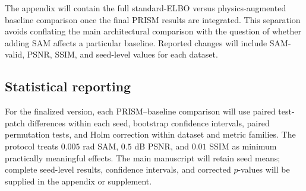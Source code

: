 \documentclass{article}
\begin{document}
The appendix will contain the full standard-ELBO versus physics-augmented baseline comparison once the final PRISM results are integrated. This separation avoids conflating the main architectural comparison with the question of whether adding SAM affects a particular baseline. Reported changes will include SAM-valid, PSNR, SSIM, and seed-level values for each dataset.

\subsection{Statistical reporting}

For the finalized version, each PRISM--baseline comparison will use paired test-patch differences within each seed, bootstrap confidence intervals, paired permutation tests, and Holm correction within dataset and metric families. The protocol treats $0.005$ rad SAM, $0.5$ dB PSNR, and $0.01$ SSIM as minimum practically meaningful effects. The main manuscript will retain seed means; complete seed-level results, confidence intervals, and corrected $p$-values will be supplied in the appendix or supplement.
\end{document}

